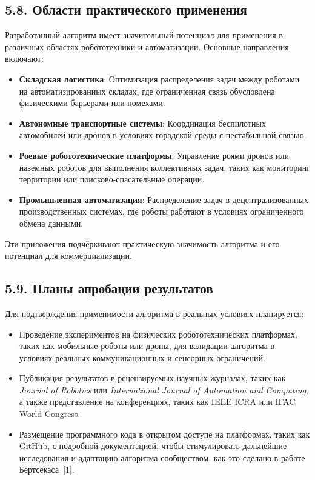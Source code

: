 \subsection*{5.8. Области практического применения}
Разработанный алгоритм имеет значительный потенциал для применения в различных областях робототехники и автоматизации. Основные направления включают:
\begin{itemize}
    \item \textbf{Складская логистика}: Оптимизация распределения задач между роботами на автоматизированных складах, где ограниченная связь обусловлена физическими барьерами или помехами.
    \item \textbf{Автономные транспортные системы}: Координация беспилотных автомобилей или дронов в условиях городской среды с нестабильной связью.
    \item \textbf{Роевые робототехнические платформы}: Управление роями дронов или наземных роботов для выполнения коллективных задач, таких как мониторинг территории или поисково-спасательные операции.
    \item \textbf{Промышленная автоматизация}: Распределение задач в децентрализованных производственных системах, где роботы работают в условиях ограниченного обмена данными.
\end{itemize}
Эти приложения подчёркивают практическую значимость алгоритма и его потенциал для коммерциализации.

\subsection*{5.9. Планы апробации результатов}
Для подтверждения применимости алгоритма в реальных условиях планируется:
\begin{itemize}
    \item Проведение экспериментов на физических робототехнических платформах, таких как мобильные роботы или дроны, для валидации алгоритма в условиях реальных коммуникационных и сенсорных ограничений.
    \item Публикация результатов в рецензируемых научных журналах, таких как \textit{Journal of Robotics} или \textit{International Journal of Automation and Computing}, а также представление на конференциях, таких как IEEE ICRA или IFAC World Congress.
    \item Размещение программного кода в открытом доступе на платформах, таких как GitHub, с подробной документацией, чтобы стимулировать дальнейшие исследования и адаптацию алгоритма сообществом, как это сделано в работе Бертсекаса~[1].
\end{itemize}

